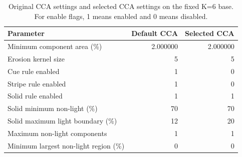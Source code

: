 \begin{table}[htbp]
\centering
\small
\caption{Original CCA settings and selected CCA settings on the fixed K=6 base. For enable flags, 1 means enabled and 0 means disabled.}
\label{tab:cca-search-parameters}
\begin{tabular}{lrr}
\toprule
Parameter & Default CCA & Selected CCA \\
\midrule
Minimum component area (\%) & 2.000000 & 2.000000 \\
Erosion kernel size & 5 & 5 \\
Cue rule enabled & 1 & 0 \\
Stripe rule enabled & 1 & 0 \\
Solid rule enabled & 1 & 1 \\
Solid minimum non-light (\%) & 70 & 70 \\
Solid maximum light boundary (\%) & 12 & 20 \\
Maximum non-light components & 1 & 1 \\
Minimum largest non-light region (\%) & 0 & 0 \\
\bottomrule
\end{tabular}
\end{table}
\FloatBarrier
